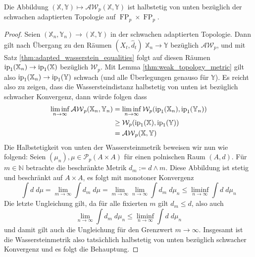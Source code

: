 \begin{corollary}
    Die Abbildung $(\mathbb{X,Y}) \mapsto \mathcal{AW}_p(\mathbb{X,Y})$ ist halbstetig von unten bezüglich der schwachen adaptierten Topologie auf $\operatorname{FP}_p\times \operatorname{FP}_p$.
\end{corollary}
\begin{proof}
    Seien $(\mathbb{X}_n, \mathbb{Y}_n) \rightarrow (\mathbb{X,Y})$ in der schwachen adaptierten Topologie. Dann gilt nach Übergang zu den Räumen $(X_t, \widehat{d}_t)$ $\mathbb{X}_n \rightarrow \mathbb{Y}$ bezüglich $\mathcal{AW}_p$, und mit Satz \ref{thm:adapted_wasserstein_equalities} folgt auf diesen Räumen $\operatorname{ip}_1(\mathbb{X}_n) \rightarrow \operatorname{ip}_1(\mathbb{X})$ bezüglich $\mathcal{W}_p$. Mit Lemma \ref{thm:weak_topology_metric} gilt also $\operatorname{ip}_1(\mathbb{X}_n) \rightarrow \operatorname{ip}_1(\mathbb{Y})$ schwach (und alle Überlegungen genauso für $\mathbb{Y}$). Es reicht also zu zeigen, dass die Wassersteindistanz halbstetig von unten ist bezüglich schwacher Konvergenz, dann würde folgen dass
    \begin{align*}
        \liminf_{n\rightarrow\infty} \mathcal{AW}_p(\mathbb{X}_n,\mathbb{Y}_n) &= \liminf_{n\rightarrow\infty} \mathcal{W}_p(\operatorname{ip}_1(\mathbb{X}_n), \operatorname{ip}_1(\mathbb{Y}_n)) \\
        &\geq \mathcal{W}_p(\operatorname{ip}_1(\mathbb{X}), \operatorname{ip}_1(\mathbb{Y})) \\
        &= \mathcal{AW}_p(\mathbb{X}, \mathbb{Y})
    \end{align*}
    Die Halbstetigkeit von unten der Wassersteinmetrik beweisen wir nun wie folgend: Seien $(\mu_n), \mu \in \mathcal{P}_p(A\times A)$ für einen polnischen Raum $(A, d)$. Für $m \in \mathbb{N}$ betrachte die beschränkte Metrik $d_m := d \wedge m$. Diese Abbildung ist stetig und beschränkt auf $A \times A$, es folgt mit monotoner Konvergenz
    $$\int d \;d\mu = \lim_{m\rightarrow \infty} \int d_m \;d\mu = \lim_{m\rightarrow\infty}\lim_{n\rightarrow\infty}\int d_m \;d\mu_n \leq \liminf_{n\rightarrow\infty} \int d \;d\mu_n$$
    Die letzte Ungleichung gilt, da für alle fixierten $m$ gilt $d_m\leq d$, also auch 
    $$\lim_{n\rightarrow\infty} \int d_m \; d\mu_n \leq \liminf_{n\rightarrow\infty} \int d \; d\mu_n$$
    und damit gilt auch die Ungleichung für den Grenzwert $m\rightarrow \infty$. Insgesamt ist die Wassersteinmetrik also tatsächlich halbstetig von unten bezüglich schwacher Konvergenz und es folgt die Behauptung.
\end{proof}